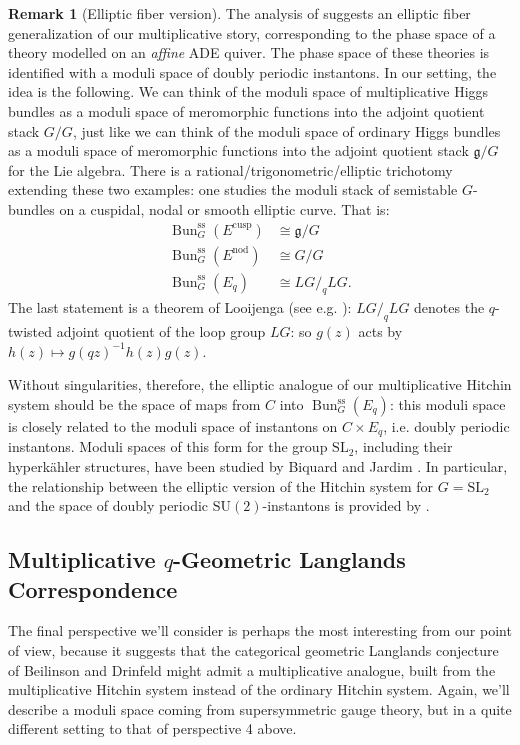 \documentclass[11pt, oneside, reqno]{amsart}
\theoremstyle{definition} \newtheorem{definition}{Definition}[section]
\theoremstyle{definition} \newtheorem{remark}[definition]{Remark}
\theoremstyle{definition} \newtheorem{remarks}[definition]{Remarks}
\theoremstyle{definition} \newtheorem{question}[definition]{Question}
\theoremstyle{definition} \newtheorem*{note}{Note}
\theoremstyle{definition} \newtheorem{example}[definition]{Example}
\theoremstyle{definition} \newtheorem{examples}[definition]{Examples}
\renewcommand{\gg}{\mathfrak{g}}
\newcommand{\mr}[1]{\mathrm{#1}}
\newcommand{\SL}{\mathrm{SL}}
\newcommand{\SU}{\mathrm{SU}}
\newcommand{\iso}{\cong}
\DeclareMathOperator{\bun}{Bun}
\begin{document}
\begin{remark}[Elliptic fiber version]
  The analysis of \cite{NekrasovPestun} suggests an elliptic fiber
  generalization of our multiplicative story, corresponding to the
  phase space of a theory modelled on an \emph{affine} ADE quiver.
  The phase space of these theories is identified with a moduli space
  of doubly periodic instantons.  In our setting, the idea is the
  following.  We can think of the moduli space of multiplicative Higgs
  bundles as a moduli space of meromorphic functions into the adjoint
  quotient stack $G/G$, just like we can think of the moduli space of
  ordinary Higgs bundles as a moduli space of meromorphic functions
  into the adjoint quotient stack $\gg/G$ for the Lie algebra.  There
  is a rational/trigonometric/elliptic trichotomy extending these two
  examples: one studies the moduli stack of semistable $G$-bundles on
  a cuspidal, nodal or smooth elliptic curve.  That is:
\begin{align*}
\bun^{\mr{ss}}_G(E^{\mr{cusp}}) &\iso \gg/G \\
\bun^{\mr{ss}}_G(E^{\mr{nod}}) &\iso G/G \\
\bun^{\mr{ss}}_G(E_q) &\iso LG/_q LG.
\end{align*}
The last statement is a theorem of Looijenga (see e.g. \cite{Laszlo}): $LG/_q LG$ denotes the $q$-twisted adjoint quotient of the loop group $LG$: so $g(z)$ acts by $h(z) \mapsto g(qz)^{-1}h(z)g(z)$.  

Without singularities, therefore, the elliptic analogue of our multiplicative Hitchin system should be the space of maps from $C$
into $\bun^{\mr{ss}}_G(E_q)$: this moduli space is closely related to the moduli space of instantons on $C \times E_q$, i.e. doubly periodic instantons.  Moduli spaces of this form for the group $\SL_2$, including their hyperk\"ahler structures, have been studied by Biquard and Jardim \cite{BiquardJardim}.  In particular, the relationship between the elliptic version of the Hitchin system for $G = \SL_2$ and the space of doubly periodic $\SU(2)$-instantons is provided by \cite[Theorem 0.2]{BiquardJardim}.
\end{remark}

\subsection{Multiplicative $q$-Geometric Langlands Correspondence}
The final perspective we'll consider is perhaps the most interesting from our point of view, because it suggests that the categorical geometric Langlands conjecture of Beilinson and Drinfeld might admit a multiplicative analogue, built from the multiplicative Hitchin system instead of the ordinary Hitchin system.  Again, we'll describe a moduli space coming from supersymmetric gauge theory, but in a quite different setting to that of perspective 4 above.
\end{document}

